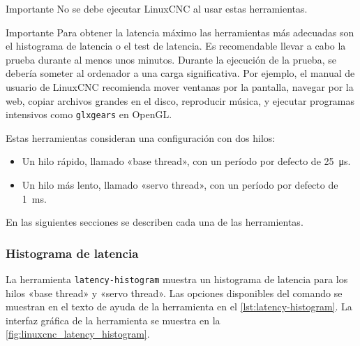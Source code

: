 \documentclass[english,spanish,a4paper,11pt]{article}
\begin{document}
\begin{admonition}{Importante}
    No se debe ejecutar LinuxCNC al usar estas herramientas.
\end{admonition}

\begin{admonition}{Importante}
    Para obtener la latencia máximo las herramientas más adecuadas son el histograma de latencia o el test de latencia. Es recomendable llevar a cabo la prueba durante al menos unos minutos. Durante la ejecución de la prueba, se debería someter al ordenador a una carga significativa. Por ejemplo, el manual de usuario de LinuxCNC recomienda mover ventanas por la pantalla, navegar por la web, copiar archivos grandes en el disco, reproducir música, y ejecutar programas intensivos como \texttt{glxgears} en OpenGL.
\end{admonition}

Estas herramientas consideran una configuración con dos hilos: 
\begin{itemize}
    \item Un hilo rápido, llamado «base thread», con un período por defecto de \qty{25}{\us}.
    
    \item Un hilo más lento, llamado «servo thread», con un período por defecto de \qty{1}{\ms}.
\end{itemize}

En las siguientes secciones se describen cada una de las herramientas.


\subsubsection{Histograma de latencia}

La herramienta \texttt{latency-histogram} muestra un histograma de latencia para los hilos «base thread» y «servo thread». Las opciones disponibles del comando se muestran en el texto de ayuda de la herramienta en el \cref{lst:latency-histogram}. La interfaz gráfica de la herramienta se muestra en la \cref{fig:linuxcnc_latency_histogram}.
\end{document}
